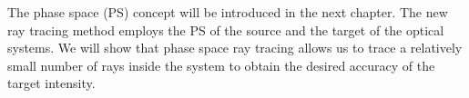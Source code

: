 The phase space (PS) concept will be introduced in the next chapter. The new ray tracing method employs the PS of the source and the target of the optical systems.
We will show that phase space ray tracing allows us to trace a relatively small number of rays inside the system to obtain the desired accuracy of the target intensity. 





















